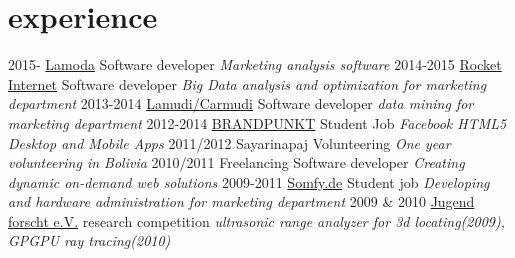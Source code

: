 \documentclass[]{friggeri-cv}
\begin{document}
\section{experience}

\begin{entrylist}
  \entry
    {2015-}
    {\href{http://www.rocket-internet.com/}{Lamoda}}
    {Software developer}
    {\emph{Marketing analysis software}}
  \entry
    {2014-2015}
    {\href{http://www.rocket-internet.com/}{Rocket Internet}}
    {Software developer}
    {\emph{Big Data analysis and optimization for marketing department}}
  \entry
    {2013-2014}
    {\href{http://www.lamudi.com/}{Lamudi/Carmudi}}
    {Software developer}
    {\emph{data mining for marketing department}}
  \entry
    {2012-2014}
    {\href{http://brandpunkt.com}{BRANDPUNKT}}
    {Student Job}
    {\emph{Facebook HTML5 Desktop and Mobile Apps}}
  \entry
    {2011/2012}
    {Sayarinapaj}
    {Volunteering}
    {\emph{One year volunteering in Bolivia}}
  \entry
    {2010/2011}
    {Freelancing}
    {Software developer}
    {\emph{Creating dynamic on-demand web solutions}}
  \entry
    {2009-2011}
    {\href{http://www.somfy.de}{Somfy.de}}
    {Student job}
    {\emph{Developing and hardware administration for marketing department }}
  \entry
    {2009 \& 2010}
    {\href{http://jugend-forscht.de}{Jugend forscht e.V.}}
    {research competition}
    {\emph{ultrasonic range analyzer for 3d locating(2009), GPGPU ray tracing(2010)}}
\end{entrylist}

%

%
%
\end{document}
